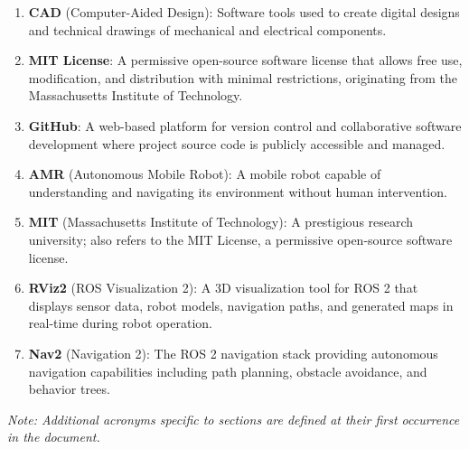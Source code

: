 \begin{enumerate}
    \item \label{acr:CAD} \textbf{CAD} (Computer-Aided Design): Software tools used to create digital designs and technical drawings of mechanical and electrical components.

    \item \label{acr:MITLicense} \textbf{MIT License}: A permissive open-source software license that allows free use, modification, and distribution with minimal restrictions, originating from the Massachusetts Institute of Technology.

    \item \label{acr:GitHub} \textbf{GitHub}: A web-based platform for version control and collaborative software development where project source code is publicly accessible and managed.

    \item \label{acr:AMR} \textbf{AMR} (Autonomous Mobile Robot): A mobile robot capable of understanding and navigating its environment without human intervention.

    \item \label{acr:MIT} \textbf{MIT} (Massachusetts Institute of Technology): A prestigious research university; also refers to the MIT License, a permissive open-source software license.

    \item \label{acr:RViz2} \textbf{RViz2} (ROS Visualization 2): A 3D visualization tool for ROS 2 that displays sensor data, robot models, navigation paths, and generated maps in real-time during robot operation.

    \item \label{acr:Nav2} \textbf{Nav2} (Navigation 2): The ROS 2 navigation stack providing autonomous navigation capabilities including path planning, obstacle avoidance, and behavior trees.

\end{enumerate}

\vspace{0.3in}

\noindent \textit{Note: Additional acronyms specific to sections are defined at their first occurrence in the document.}
